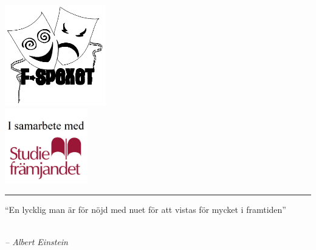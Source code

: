 \begin{center}
\parbox[c][][c]{0.45\textwidth}{\centering \includegraphics[width=0.33\textwidth]{Bilder/Loggor/Spexloggaoifylld3.png} \\\vspace{0.2cm}
\includegraphics[width=0.27\textwidth]{Bilder/Loggor/studieframjandet_samarbete.jpg}}


\rule{\textwidth}{1pt}
\end{center}

\newpage

\vspace*{\fill}
\begingroup
\raggedright{
\huge{“En lycklig man är för nöjd med nuet för att vistas för mycket i framtiden” \\}
}
\endgroup
\begingroup
\begin{centering}
\huge{\ \\
\emph{\hspace{65mm} -- Albert Einstein}}
\end{centering}
\endgroup
\vspace*{\fill}
\newpage
